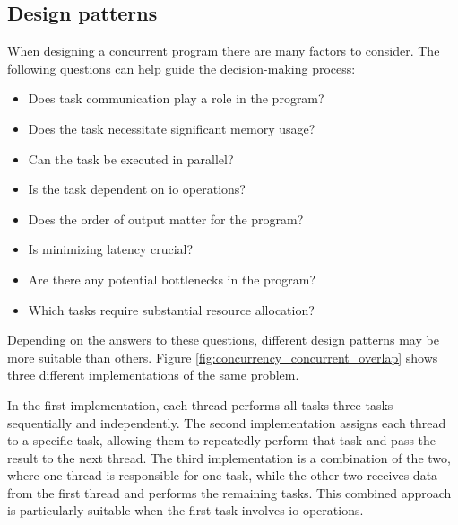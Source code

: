 \subsection{Design patterns}
When designing a concurrent program there are many factors to consider. The following questions can help guide the decision-making process:

\begin{itemize}
    \item Does task communication play a role in the program?
    \item Does the task necessitate significant memory usage?
    \item Can the task be executed in parallel?
    \item Is the task dependent on \gls{io} operations?
    \item Does the order of output matter for the program?
    \item Is minimizing latency crucial?
    \item Are there any potential bottlenecks in the program?
    \item Which tasks require substantial resource allocation?
\end{itemize}

Depending on the answers to these questions, different design patterns may be more suitable than others.
Figure \ref{fig:concurrency_concurrent_overlap} shows three different implementations of the same problem.

In the first implementation, each thread performs all tasks three tasks sequentially and independently.
The second implementation assigns each thread to a specific task, allowing them to repeatedly perform that task and pass the result to the next thread.
The third implementation is a combination of the two, where one thread is responsible for one task, while the other two receives data from the first thread and performs the remaining tasks.
This combined approach is particularly suitable when the first task involves \gls{io} operations.

